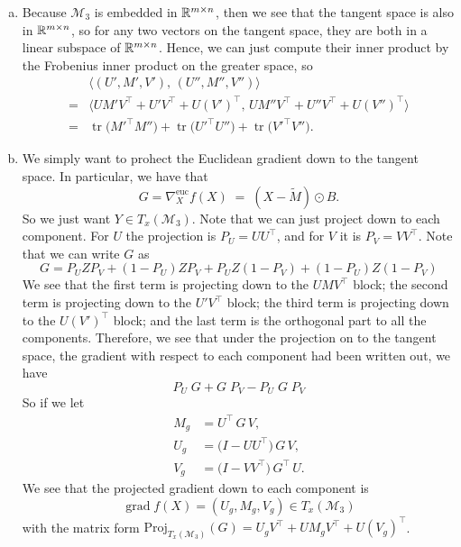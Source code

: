 \documentclass[11pt]{scrartcl}
\newcommand{\grad}{\operatorname{grad}}
\newcommand{\tr}{\operatorname{tr}}
\begin{document}
\begin{enumerate}[(a)]
    \item Because $\mathcal M_3$ is embedded in $\mathbb R^{m\times n}$, then we see that the tangent space is also in $\mathbb R^{m\times n}$, so for any two vectors on the tangent space, they are both in a linear subspace of $\mathbb R^{m\times n}$. Hence, we can just compute their inner product by the Frobenius inner product on the greater space, so \begin{align*}
        &\bigl\langle (U',M',V'),\,(U'',M'',V'')\bigr\rangle \\
        =& \bigl\langle U M' V^{\top} + U' V^{\top} + U (V')^{\top},\,
                    U M'' V^{\top} + U'' V^{\top} + U (V'')^{\top}\bigr\rangle\\
        =& \tr\bigl(M'^{\top}M''\bigr)
        + \tr\bigl(U'^{\top}U''\bigr)
        + \tr\bigl(V'^{\top}V''\bigr).
    \end{align*}
    \item We simply want to prohect the Euclidean gradient down to the tangent space. In particular, we have that \[G=\nabla_X^{\text{euc}} f(X)\;=\;(X-\widetilde M)\odot B.\]
    So we just want $Y \in T_x(\mathcal M_3)$. Note that we can just project down to each component. For $U$ the projection is $P_U = UU^\top$, and for $V$ it is $P_V = VV^\top$. Note that we can write $G$ as \[G = P_UZ P_V + (1-P_U) Z P_V + P_UZ (1-P_V) + (1-P_U)Z (1-P_V)\]
    We see that the first term is projecting down to the $UMV^\top$ block; the second term is projecting down to the $U'V^\top$ block; the third term is projecting down to the $U(V')^\top$ block; and the last term is the orthogonal part to all the components. Therefore, we see that under the projection on to the tangent space, the gradient with respect to each component had been written out, we have \[P_U \; G + G \; P_V - P_U \; G \; P_V\]
    So if we let \[
        \begin{aligned}
        M_g &= U^{\top}\,G\,V,\\
        U_g &= \bigl(I - U U^{\top}\bigr)\,G\,V,\\
        V_g &= \bigl(I - V V^{\top}\bigr)\,G^{\top}\,U.
        \end{aligned}
    \]
    We see that the projected gradient down to each component is \[\grad f(X) = (U_g, M_g, V_g) \in T_x(\mathcal M_3)\]
    with the matrix form $\text{Proj}_{T_x(\mathcal M_3)}(G) = U_g V^{\top} + U M_g V^{\top} + U (V_g)^{\top}$.
\end{enumerate}
\end{document}
